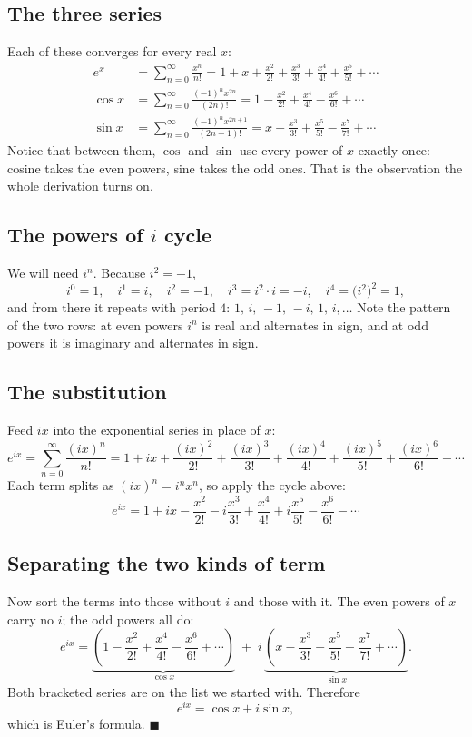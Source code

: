 \documentclass[11pt]{article}
\theoremstyle{definition}
\theoremstyle{remark}
\begin{document}
\subsection*{The three series}
Each of these converges for every real $x$:
\begin{align*}
  e^{x}    &= \sum_{n=0}^{\infty}\frac{x^{n}}{n!}
            = 1 + x + \frac{x^{2}}{2!} + \frac{x^{3}}{3!}
              + \frac{x^{4}}{4!} + \frac{x^{5}}{5!} + \cdots \\[4pt]
  \cos x   &= \sum_{n=0}^{\infty}\frac{(-1)^{n}x^{2n}}{(2n)!}
            = 1 - \frac{x^{2}}{2!} + \frac{x^{4}}{4!}
              - \frac{x^{6}}{6!} + \cdots \\[4pt]
  \sin x   &= \sum_{n=0}^{\infty}\frac{(-1)^{n}x^{2n+1}}{(2n+1)!}
            = x - \frac{x^{3}}{3!} + \frac{x^{5}}{5!}
              - \frac{x^{7}}{7!} + \cdots
\end{align*}
Notice that between them, $\cos$ and $\sin$ use every power of $x$ exactly once:
cosine takes the even powers, sine takes the odd ones. That is the observation
the whole derivation turns on.

\subsection*{The powers of $i$ cycle}
We will need $i^{n}$. Because $i^{2}=-1$,
\[
  i^{0}=1,\quad i^{1}=i,\quad i^{2}=-1,\quad i^{3}=i^{2}\cdot i=-i,\quad
  i^{4}=\bigl(i^{2}\bigr)^{2}=1,
\]
and from there it repeats with period $4$: $1,\,i,\,-1,\,-i,\,1,\,i,\dots$ Note
the pattern of the two rows: at even powers $i^{n}$ is real and alternates in
sign, and at odd powers it is imaginary and alternates in sign.

\subsection*{The substitution}
Feed $ix$ into the exponential series in place of $x$:
\[
  e^{ix}
  = \sum_{n=0}^{\infty}\frac{(ix)^{n}}{n!}
  = 1 + ix + \frac{(ix)^{2}}{2!} + \frac{(ix)^{3}}{3!}
    + \frac{(ix)^{4}}{4!} + \frac{(ix)^{5}}{5!} + \frac{(ix)^{6}}{6!} + \cdots
\]
Each term splits as $(ix)^{n}=i^{n}x^{n}$, so apply the cycle above:
\[
  e^{ix}
  = 1 + ix - \frac{x^{2}}{2!} - i\frac{x^{3}}{3!}
    + \frac{x^{4}}{4!} + i\frac{x^{5}}{5!} - \frac{x^{6}}{6!} - \cdots
\]

\subsection*{Separating the two kinds of term}
Now sort the terms into those without $i$ and those with it. The even powers of
$x$ carry no $i$; the odd powers all do:
\[
  e^{ix}
  = \underbrace{\left(1 - \frac{x^{2}}{2!} + \frac{x^{4}}{4!}
      - \frac{x^{6}}{6!} + \cdots\right)}_{\textstyle \cos x}
    \;+\; i\,
    \underbrace{\left(x - \frac{x^{3}}{3!} + \frac{x^{5}}{5!}
      - \frac{x^{7}}{7!} + \cdots\right)}_{\textstyle \sin x} .
\]
Both bracketed series are on the list we started with. Therefore
\[
  e^{ix} = \cos x + i\sin x ,
\]
which is Euler's formula. \hfill$\blacksquare$
\end{document}
